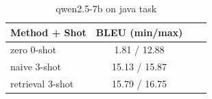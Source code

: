 \begin{table}[ht]
\centering
\small
\caption{qwen2.5-7b on java task}
\begin{tabular}{lccc}
\hline
Method + Shot & BLEU (min/max) \\
\hline
zero 0-shot & 1.81 / 12.88 \\
naive 3-shot & 15.13 / 15.87 \\
retrieval 3-shot & 15.79 / 16.75 \\
\hline
\end{tabular}
\end{table}
